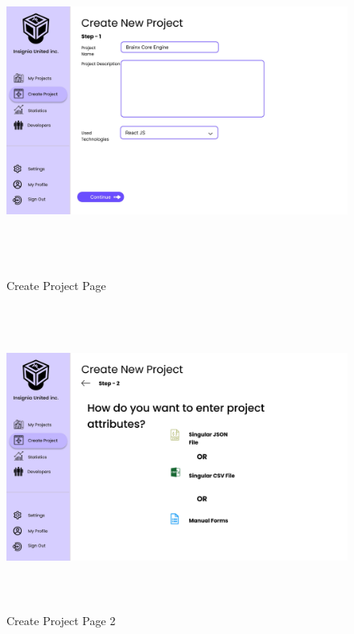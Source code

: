 \begin{figure}[H]
\includegraphics[height=10cm, width=1\textwidth]{./images/prototype/0010}
\centering 
\caption{Create Project Page}
\label{fig:prototype1}

\includegraphics[height=10cm, width=1\textwidth]{./images/prototype/0012}
\centering 
\caption{Create Project Page 2}
\label{fig:prototype1}
\end{figure}


